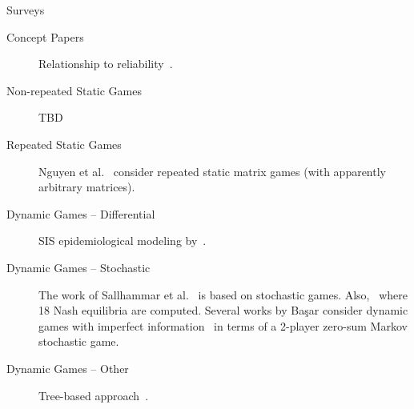 \documentclass{sig-alternate}
\begin{document}
\begin{description}
\item[Surveys] \cite{liang2013game,roy2010survey}

\item[Concept Papers] Relationship to reliability~\cite{bier2006game}.

\item[Non-repeated Static Games] TBD

\item[Repeated Static Games] Nguyen et
  al.~\cite{nguyen2009security} consider repeated static matrix games
  (with apparently arbitrary matrices).


\item[Dynamic Games -- Differential] SIS epidemiological modeling
  by~\cite{bensoussan2010game}.


\item[Dynamic Games -- Stochastic] The work of Sallhammar et
  al.~\cite{sallhammar2007using, sallhammar2005incorporating,
    sallhammar2006stochastic, sallhammar2006towards,
    sallhammar2007framework} is based on stochastic
  games. Also,~\cite{lye2005game} where 18 Nash equilibria are
  computed. Several works by Ba{\c{s}}ar consider dynamic games with
  imperfect information~\cite{alpcan2006intrusion} in terms of a
  2-player zero-sum Markov stochastic game.

\item[Dynamic Games -- Other] Tree-based approach~\cite{luo2010game}. 

\end{description}

%

%
%

\end{document}
